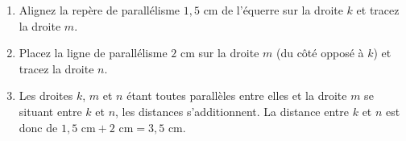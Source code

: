 %
%
\begin{enumerate}
    \item Alignez la repère de parallélisme $1,5\text{ cm}$ de l'équerre sur la droite $k$ et tracez la droite $m$.
    \item Placez la ligne de parallélisme $2\text{ cm}$ sur la droite $m$ (du côté opposé à $k$) et tracez la droite $n$.
    \item Les droites $k$, $m$ et $n$ étant toutes parallèles entre elles et la droite $m$ se situant entre $k$ et $n$, les distances s'additionnent. La distance entre $k$ et $n$ est donc de $1,5\text{ cm} + 2\text{ cm} = 3,5\text{ cm}$.
\end{enumerate}
